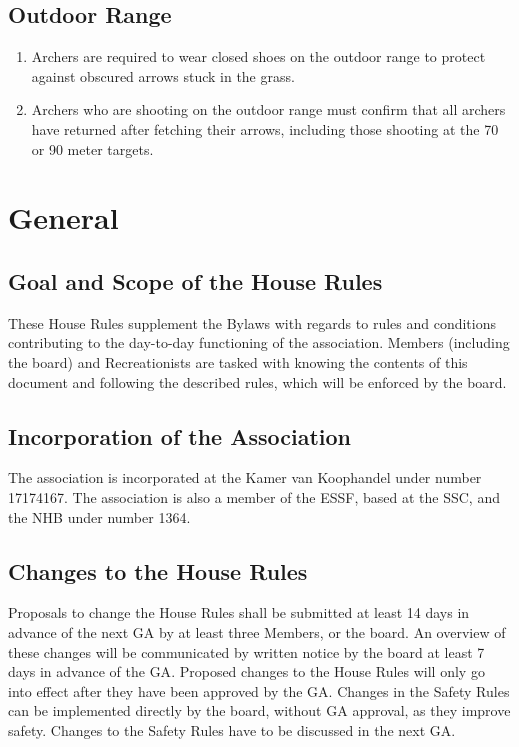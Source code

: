 \documentclass[a4paper]{article}
\newcommand{\Asta}{Bylaws} %
\newcommand{\Ahr}{House Rules} %
\newcommand{\Asr}{Safety Rules} %
\begin{document}
\subsection{Outdoor Range}
\label{rules:outdoor}

\begin{enumerate}
  \item { Archers} are required to wear closed shoes on the outdoor range to protect against obscured arrows stuck in the grass.
  \item { Archers} who are shooting on the outdoor range must confirm that all { archers} have returned after fetching their arrows, including those shooting at the 70 or 90 meter targets.
\end{enumerate}

\pagebreak

\section{General}
\subsection{Goal and Scope of the \Ahr}
These { \Ahr} supplement the { \Asta} with regards to rules and conditions contributing to the day-to-day functioning of the association. { Members} (including the board) and { Recreationists} are tasked with knowing the contents of this document and following the described rules, which will be enforced by the board.

\subsection{Incorporation of the Association}
The association is incorporated at the Kamer van Koophandel under number 17174167. The association is also a member of the { ESSF}, based at the { SSC}, and the { NHB} under number 1364.

\subsection{Changes to the \Ahr}
Proposals to change the { \Ahr} shall be submitted at least 14 days in advance of the next { GA} by at least three { Members}, or the board. An overview of these changes will be communicated by written notice by the board at least 7 days in advance of the { GA}. Proposed changes to the { \Ahr} will only go into effect after they have been approved by the { GA}. Changes in the { \Asr} can be implemented directly by the board, without { GA} approval, as they improve safety. Changes to the { \Asr} have to be discussed in the next { GA}.
\end{document}

